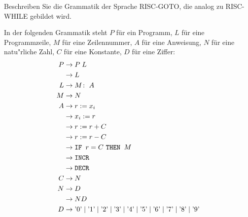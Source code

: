 Beschreiben Sie die Grammatik der Sprache RISC-GOTO, die analog zu
RISC-WHILE gebildet wird.


\begin{loesung}
In der folgenden Grammatik steht $P$ für ein Programm, $L$ für
eine Programmzeile, $M$ für eine Zeilennummer, $A$ für eine
Anweisung, $N$ für eine natu"rliche Zahl, $C$ für eine Konstante,
$D$ für eine Ziffer:
\begin{align*}
P&\rightarrow P\; L\\
 &\rightarrow L\\
L&\rightarrow M\colon \; A\\
M&\rightarrow N\\
A&\rightarrow r := x_i\\
 &\rightarrow x_i := r\\
 &\rightarrow r := r + C\\
 &\rightarrow r := r - C\\
 &\rightarrow \text{\tt IF } r = C \text{ \tt THEN } M\\
 &\rightarrow \texttt{INCR}\\
 &\rightarrow \texttt{DECR}\\
C&\rightarrow N\\
N&\rightarrow D\\
 &\rightarrow ND\\
D&\rightarrow
\text{'0'}\;|\;
\text{'1'}\;|\;
\text{'2'}\;|\;
\text{'3'}\;|\;
\text{'4'}\;|\;
\text{'5'}\;|\;
\text{'6'}\;|\;
\text{'7'}\;|\;
\text{'8'}\;|\;
\text{'9'}
\end{align*}
\end{loesung}
